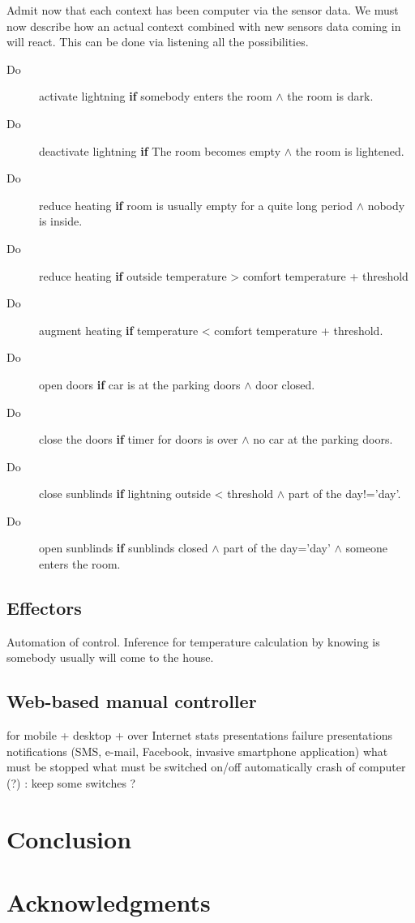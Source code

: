 \documentclass{acm_proc_article-sp}
\begin{document}
Admit now that each context has been computer via the sensor data. We must now describe how an actual context combined with new sensors data coming in will react. This can be done via listening all the possibilities.
\begin{description}
 \item[Do] activate lightning \textbf{if} somebody enters the room $\land$ the room is dark.
 \item[Do] deactivate lightning \textbf{if} The room becomes empty $\land$ the room is lightened.
 \item[Do] reduce heating \textbf{if} room is usually empty for a quite long period $\land$ nobody is inside.
 \item[Do] reduce heating \textbf{if} outside temperature > comfort temperature + threshold
 \item[Do] augment heating \textbf{if} temperature < comfort temperature + threshold.
 \item[Do] open doors \textbf{if} car is at the parking doors $\land$ door closed.
 \item[Do] close the doors \textbf{if} timer for doors is over $\land$ no car at the parking doors.
 \item[Do] close sunblinds \textbf{if} lightning outside < threshold $\land$ part of the day!=’day’.
 \item[Do] open sunblinds \textbf{if} sunblinds closed $\land$ part of the day=’day’ $\land$ someone enters the room.
\end{description}

\subsection{Effectors}
Automation of control. Inference for temperature calculation by knowing is somebody usually will come to the house.
\subsection{Web-based manual controller}
for mobile + desktop + over Internet
stats presentations
failure presentations
notifications (SMS, e-mail, Facebook, invasive smartphone application)
	what must be stopped
	what must be switched on/off automatically
	crash of computer (?) : keep some switches ?
\section{Conclusion}
\section{Acknowledgments}



%
\end{document}
